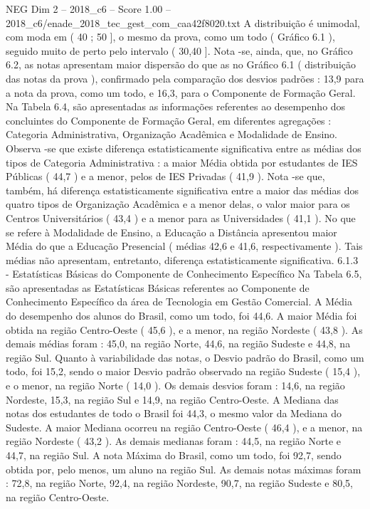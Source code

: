 \begin{textsample}{NEG Dim 2 – 2018\_c6 – Score 1.00 – 2018\_c6/enade\_2018\_tec\_gest\_com\_caa42f8020.txt}
A distribuição é unimodal, com moda em ( 40 ; 50 ], o mesmo da prova, como um todo ( Gráfico 6.1 ), seguido muito de perto pelo intervalo ( 30,40 ].
Nota -se, ainda, que, no Gráfico 6.2, as notas apresentam maior dispersão do que as no Gráfico 6.1 ( distribuição das notas da prova ), confirmado pela comparação dos desvios padrões : 13,9 para a nota da prova, como um todo, e 16,3, para o Componente de Formação Geral.
Na Tabela 6.4, são apresentadas as informações referentes ao desempenho dos concluintes do Componente de Formação Geral, em diferentes agregações : Categoria Administrativa, Organização Acadêmica e Modalidade de Ensino.
Observa -se que existe diferença estatisticamente significativa entre as médias dos tipos de Categoria Administrativa : a maior Média obtida por estudantes de IES Públicas ( 44,7 ) e a menor, pelos de IES Privadas ( 41,9 ).
Nota -se que, também, há diferença estatisticamente significativa entre a maior das médias dos quatro tipos de Organização Acadêmica e a menor delas, o valor maior para os Centros Universitários ( 43,4 ) e a menor para as Universidades ( 41,1 ).
No que se refere à Modalidade de Ensino, a Educação a Distância apresentou maior Média do que a Educação Presencial ( médias 42,6 e 41,6, respectivamente ).
Tais médias não apresentam, entretanto, diferença estatisticamente significativa. 6.1.3 - Estatísticas Básicas do Componente de Conhecimento Específico Na Tabela 6.5, são apresentadas as Estatísticas Básicas referentes ao Componente de Conhecimento Específico da área de Tecnologia em Gestão Comercial.
A Média do desempenho dos alunos do Brasil, como um todo, foi 44,6.
A maior Média foi obtida na região Centro-Oeste ( 45,6 ), e a menor, na região Nordeste ( 43,8 ).
As demais médias foram : 45,0, na região Norte, 44,6, na região Sudeste e 44,8, na região Sul.
Quanto à variabilidade das notas, o Desvio padrão do Brasil, como um todo, foi 15,2, sendo o maior Desvio padrão observado na região Sudeste ( 15,4 ), e o menor, na região Norte ( 14,0 ).
Os demais desvios foram : 14,6, na região Nordeste, 15,3, na região Sul e 14,9, na região Centro-Oeste.
A Mediana das notas dos estudantes de todo o Brasil foi 44,3, o mesmo valor da Mediana do Sudeste.
A maior Mediana ocorreu na região Centro-Oeste ( 46,4 ), e a menor, na região Nordeste ( 43,2 ).
As demais medianas foram : 44,5, na região Norte e 44,7, na região Sul.
A nota Máxima do Brasil, como um todo, foi 92,7, sendo obtida por, pelo menos, um aluno na região Sul.
As demais notas máximas foram : 72,8, na região Norte, 92,4, na região Nordeste, 90,7, na região Sudeste e 80,5, na região Centro-Oeste.

\end{textsample}
